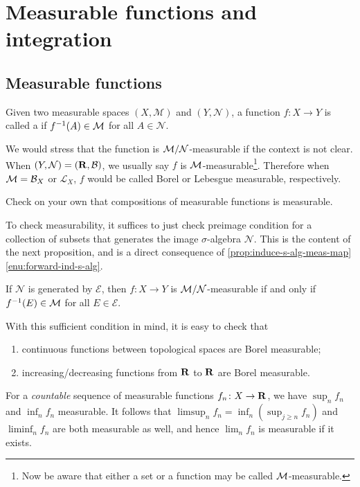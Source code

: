 \chapter{Measurable functions and integration} \label{chap:meas-func-int}
\section{Measurable functions}\label{sec:measurable-functions}

\begin{defn}
    Given two measurable spaces $(X,\mathcal{M})$ and $(Y,\mathcal{N})$, a function $f\colon X \to Y$ is called a  if $f^{-1}(A) \in \mathcal{M}$ for all $A \in \mathcal{N}$.
    
    We would stress that the function is $\mathcal{M}/\mathcal{N}$-measurable if the context is not clear. When $(Y,\mathcal{N}) = (\mathbf{R},\mathcal{B})$, we usually say $f$ is $\mathcal{M}$-measurable\footnote{Now be aware that either a set or a function may be called $\mathcal{M}$-measurable.}. Therefore when $\mathcal{M}=\mathcal{B}_X$ or $\mathcal{L}_X$, $f$ would be called Borel or Lebesgue measurable, respectively.
\end{defn}

Check on your own that compositions of measurable functions is measurable.

To check measurability, it suffices to just check preimage condition for a collection of subsets that generates the image $\sigma$-algebra $\mathcal{N}$. This is the content of the next proposition, and is a direct consequence of \cref{prop:induce-s-alg-meas-map}\ref{enu:forward-ind-s-alg}.
\begin{prop}\label{prop:measurability-generate}
    If $\mathcal{N}$ is generated by $\mathcal{E}$, then $f\colon X \to Y$ is $\mathcal{M}/\mathcal{N}$-measurable if and only if $f^{-1}(E) \in \mathcal{M}$ for all $E \in \mathcal{E}$.
\end{prop}

With this sufficient condition in mind, it is easy to check that \begin{enumerate}
    \item continuous functions between topological spaces are Borel measurable;
    \item increasing/decreasing functions from $\mathbf{R}$ to $\mathbf{R}$ are Borel measurable.
\end{enumerate}

\begin{fact}
    For a \emph{countable} sequence of measurable functions $f_n\colon X \to \mathbf{R}$, we have $\sup_n f_n$ and $\inf_n f_n$ measurable. It follows that $\limsup_n f_n = \inf_n (\sup_{j\geq n} f_n)$ and  $\liminf_n f_n$ are both measurable as well, and hence $\lim_n f_n$ is measurable if it exists.
\end{fact}


